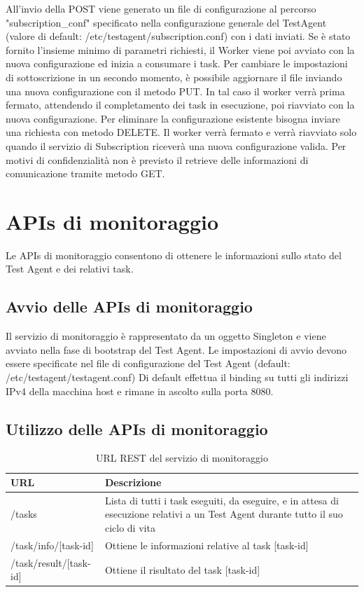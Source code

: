 All'invio della POST viene generato un file di configurazione al percorso "subscription\_conf" specificato nella configurazione generale del TestAgent (valore di default: /etc/testagent/subscription.conf) con i dati inviati.
Se è stato fornito l'insieme minimo di parametri richiesti, il Worker viene poi avviato con la nuova configurazione ed inizia a consumare i task.
Per cambiare le impostazioni di sottoscrizione in un secondo momento, è possibile aggiornare il file inviando una nuova configurazione con il metodo PUT.
In tal caso il worker verrà prima fermato, attendendo il completamento dei task in esecuzione, poi riavviato con la nuova configurazione.
Per eliminare la configurazione esistente bisogna inviare una richiesta con metodo DELETE.
Il worker verrà fermato e verrà riavviato solo quando il servizio di Subscription riceverà una nuova configurazione valida.
Per motivi di confidenzialità non è previsto il retrieve delle informazioni di comunicazione tramite metodo GET.
\section{APIs di monitoraggio}
Le APIs di monitoraggio consentono di ottenere le informazioni sullo stato del Test Agent e dei relativi task.
\subsection{Avvio delle APIs di monitoraggio}
Il servizio di monitoraggio è rappresentato da un oggetto Singleton e viene avviato nella fase di bootstrap del Test Agent.
Le impostazioni di avvio devono essere specificate nel file di configurazione del Test Agent (default: /etc/testagent/testagent.conf)
Di default effettua il binding su tutti gli indirizzi IPv4 della macchina host e rimane in ascolto sulla porta 8080.
\subsection{Utilizzo delle APIs di monitoraggio}
\begin{table}[h]
\centering
\begin{tabular}{| m{4.4cm}| m{9cm} | }
\hline
\textbf{URL} & \textbf{Descrizione} \\ \hline
/tasks & Lista di tutti i task eseguiti, da eseguire, e in attesa di esecuzione relativi a un Test Agent durante tutto il suo ciclo di vita \\ \hline 
/task/info/[task-id] & Ottiene le informazioni relative al task [task-id]\\ \hline
/task/result/[task-id] & Ottiene il risultato del task [task-id]\\ \hline
\end{tabular}
\caption{URL REST del servizio di monitoraggio}
\label{tab:monitoring urls}
\end{table}
